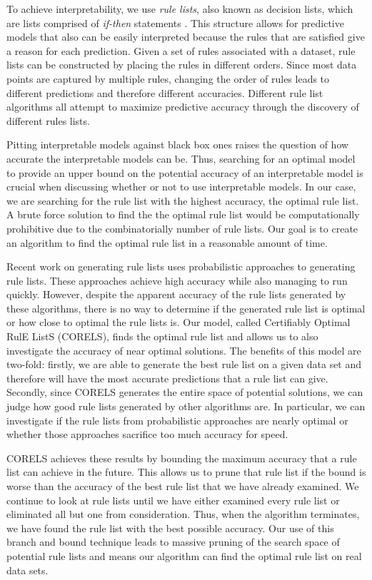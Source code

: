 \documentclass[]{article}
\begin{document}
To achieve interpretability, we use \emph{rule lists}, also known as decision lists, which are lists comprised of \emph{if-then} statements \cite{Rivest87}. 
This structure allows for predictive models that also can be easily interpreted because the rules that are satisfied give a reason for each prediction. 
Given a set of rules associated with a dataset, rule lists can be constructed by placing the rules in different orders.
Since most data points are captured by multiple rules, changing the order of rules leads to different predictions and therefore different accuracies. 
Different rule list algorithms all attempt to maximize predictive accuracy through the discovery of different rules lists.

Pitting interpretable models against black box ones raises the question of how accurate the interpretable models can be.
Thus, searching for an optimal model to provide an upper bound on the potential accuracy of an interpretable model is crucial when discussing whether or not to use interpretable models.
In our case, we are searching for the  rule list with the highest accuracy, the optimal rule list. 
A brute force solution to find the the optimal rule list would be computationally prohibitive due to the combinatorially number of rule lists.
Our goal is to create an algorithm to find the optimal rule list in a reasonable amount of time.

Recent work on generating rule lists \cite{LethamRuMcMa15,YangRuSe16} uses
probabilistic approaches to generating rule lists. 
These approaches achieve high accuracy while also managing to run quickly. 
However, despite the apparent accuracy of the rule lists generated by these algorithms, there is no way to determine if the generated rule list is optimal or how close to optimal the rule lists is. 
Our model, called Certifiably Optimal RulE ListS (CORELS), finds the optimal rule list and allows us to also investigate the accuracy of near optimal solutions. 
The benefits of this model are two-fold: firstly, we are able to generate the best rule list on a given data set and therefore will have the most accurate predictions that a rule list can give. 
Secondly, since CORELS generates the entire space of potential solutions, we can judge how good rule lists generated by other algorithms are. 
In particular, we can investigate if the rule lists from probabilistic approaches are nearly optimal or whether those approaches sacrifice too much accuracy for speed.

CORELS achieves these results by bounding the maximum accuracy that a rule list can achieve in the future. 
This allows us to prune that rule list if the bound is worse than the accuracy of the best rule list that we have already examined. 
We continue to look at rule lists until we have either examined every rule list or eliminated all but one from consideration. 
Thus, when the algorithm terminates, we have found the rule list with the best possible accuracy. 
Our use of this branch and bound technique leads to massive pruning of the search space of potential rule lists and means our algorithm can find the optimal rule list on real data sets.
\end{document}
